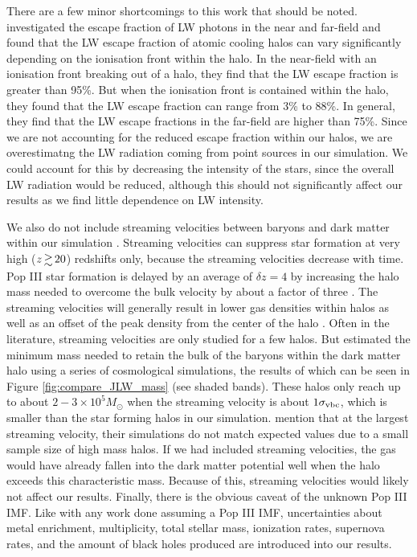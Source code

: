 \documentclass[a4paper,fleqn,usenatbib]{mnras}
\begin{document}
There are a few minor shortcomings to this work that should be noted. \citet{Schauer17} investigated the escape fraction of LW photons in the near and far-field and found that the LW escape fraction of atomic cooling halos can vary significantly depending on the ionisation front within the halo. In the near-field with an ionisation front breaking out of a halo, they find that the LW escape fraction is greater than 95\%. But when the ionisation front is contained within the halo, they found that the LW escape fraction can range from 3\% to 88\%. In general, they find that the LW escape fractions in the far-field are higher than 75\%. Since we are not accounting for the reduced escape fraction within our halos, we are overestimatng the LW radiation coming from point sources in our simulation. We could account for this by decreasing the intensity of the stars, since the overall LW radiation would be reduced, although this should not significantly affect our results as we find little dependence on LW intensity. 

We also do not include streaming velocities between baryons and dark matter within our simulation \citep{Tselia11, Greif11_Delay, Naoz12, OLeary12}. Streaming velocities can suppress star formation at very high ($z \ga 20$) redshifts only, because the streaming velocities decrease with time. Pop III star formation is delayed by an average of $\delta z = 4$ by increasing the halo mass needed to overcome the bulk velocity by about a factor of three \citep{Greif11_Delay}. The streaming velocities will generally result in lower gas densities within halos as well as an offset of the peak density from the center of the halo \citep{OLeary12}. Often in the literature, streaming velocities are only studied for a few halos. But \citet{Naoz13} estimated the minimum mass needed to retain the bulk of the baryons within the dark matter halo using a series of cosmological simulations, the results of which can be seen in Figure \ref{fig:compare_JLW_mass} (see shaded bands). These halos only reach up to about $2 - 3 \times 10^5 M_\odot$ when the streaming velocity is about $1\sigma_{\rm vbc}$, which is smaller than the star forming halos in our simulation. \citet{Naoz13} mention that at the largest streaming velocity, their simulations do not match expected values due to a small sample size of high mass halos. If we had included streaming velocities, the gas would have already fallen into the dark matter potential well when the halo exceeds this characteristic mass. Because of this, streaming velocities would likely not affect our results. Finally, there is the obvious caveat of the unknown Pop III IMF. Like with any work done assuming a Pop III IMF, uncertainties about metal enrichment, multiplicity, total stellar mass, ionization rates, supernova rates, and the amount of black holes produced are introduced into our results.
\end{document}
